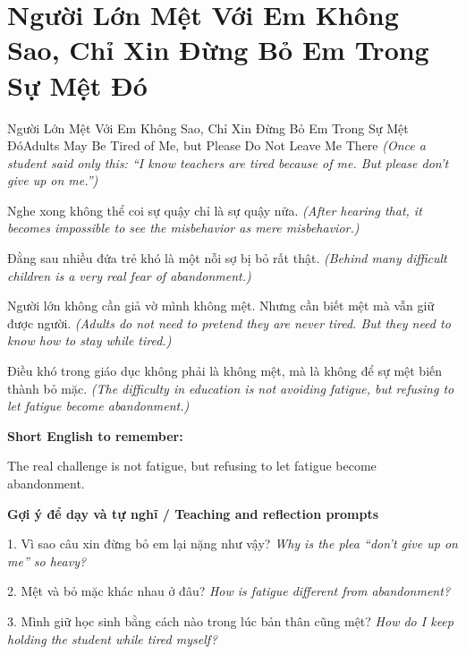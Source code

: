 \section{Người Lớn Mệt Với Em Không Sao, Chỉ Xin Đừng Bỏ Em Trong Sự Mệt Đó}
\begin{truyen}{Người Lớn Mệt Với Em Không Sao, Chỉ Xin Đừng Bỏ Em Trong Sự Mệt Đó}{Adults May Be Tired of Me, but Please Do Not Leave Me There}
\textit{(Once a student said only this: “I know teachers are tired because of me. But please don't give up on me.”)}

Nghe xong không thể coi sự quậy chỉ là sự quậy nữa.
\textit{(After hearing that, it becomes impossible to see the misbehavior as mere misbehavior.)}

Đằng sau nhiều đứa trẻ khó là một nỗi sợ bị bỏ rất thật.
\textit{(Behind many difficult children is a very real fear of abandonment.)}

Người lớn không cần giả vờ mình không mệt. Nhưng cần biết mệt mà vẫn giữ được người.
\textit{(Adults do not need to pretend they are never tired. But they need to know how to stay while tired.)}

\end{truyen}

\begin{baihoc}
Điều khó trong giáo dục không phải là không mệt, mà là không để sự mệt biến thành bỏ mặc.
\textit{(The difficulty in education is not avoiding fatigue, but refusing to let fatigue become abandonment.)}
\end{baihoc}

\begin{ghinhoanh}
\textbf{Short English to remember:}

The real challenge is not fatigue, but refusing to let fatigue become abandonment.

\end{ghinhoanh}

\begin{tuhocnhanh}
\textbf{Gợi ý để dạy và tự nghĩ / Teaching and reflection prompts}

1. Vì sao câu xin đừng bỏ em lại nặng như vậy? \textit{Why is the plea “don't give up on me” so heavy?}

2. Mệt và bỏ mặc khác nhau ở đâu? \textit{How is fatigue different from abandonment?}

3. Mình giữ học sinh bằng cách nào trong lúc bản thân cũng mệt? \textit{How do I keep holding the student while tired myself?}
\end{tuhocnhanh}
\ngancach

